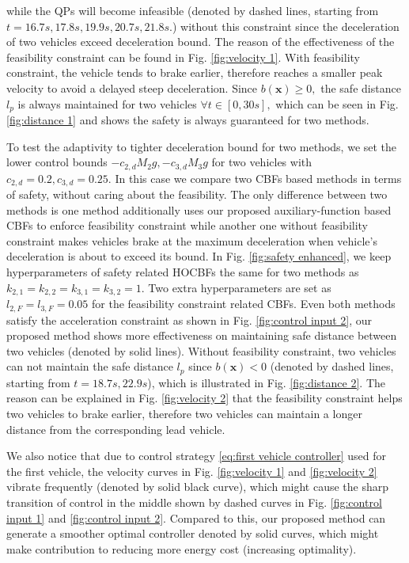 \documentclass[letterpaper, 10 pt, conference]{ieeeconf}
\theoremstyle{definition}
\begin{document}
while the QPs will become infeasible (denoted by dashed lines, starting from $t=16.7s, 17.8s, 19.9s, 20.7s, 21.8s.$) without this constraint since the deceleration of two vehicles exceed deceleration bound. The reason of the effectiveness of the feasibility constraint can be found in Fig. \ref{fig:velocity 1}. With feasibility constraint, the vehicle tends to brake earlier, therefore reaches a smaller peak velocity to avoid a delayed steep deceleration. Since $b(\boldsymbol{x})\ge 0,$ the safe distance $l_{p}$ is always maintained for two vehicles $\forall t \in [0, 30s],$ which can be seen in Fig. \ref{fig:distance 1} and shows the safety is always guaranteed for two methods. 

To test the adaptivity to tighter deceleration bound for two methods,  we set the lower
control bounds $-c_{2,d}M_{2}g, -c_{3,d}M_{3}g$ for two vehicles with $c_{2,d}=0.2,c_{3,d}=0.25.$ In this case we compare two CBFs based methods in terms of safety, without caring about the feasibility. The only difference between two methods is one method additionally uses our proposed auxiliary-function based CBFs to enforce feasibility constraint while another one without feasibility constraint makes vehicles brake at the maximum deceleration when vehicle's deceleration is about to exceed its bound. In Fig. \ref{fig:safety enhanced}, we keep hyperparameters of safety related HOCBFs the same for two methods as $k_{2,1}=k_{2,2}=k_{3,1}=k_{3,2}=1.$ Two extra hyperparameters are set as $l_{2,F}=l_{3,F}=0.05$ for the feasibility constraint related CBFs. Even both methods satisfy the acceleration constraint as shown in Fig. \ref{fig:control input 2}, our proposed method shows more effectiveness on maintaining safe distance between two vehicles (denoted by solid lines). Without feasibility constraint, two vehicles can not maintain the safe distance $l_{p}$ since $b(\boldsymbol{x}) <0$ (denoted by dashed lines, starting from $t=18.7s,22.9s$), which is illustrated in Fig. \ref{fig:distance 2}. The reason can be explained in Fig. \ref{fig:velocity 2} that the feasibility constraint helps two vehicles to brake earlier, therefore two vehicles can maintain a longer distance from the corresponding lead vehicle.

We also notice that due to control strategy \eqref{eq:first vehicle controller} used for the first vehicle, the velocity curves in Fig. \ref{fig:velocity 1} and \ref{fig:velocity 2} vibrate frequently (denoted by solid black curve), which might cause the sharp transition of control in the middle shown by dashed curves in Fig. \ref{fig:control input 1} and \ref{fig:control input 2}. Compared to this, our proposed method can generate a smoother optimal controller denoted by solid curves, which might make contribution to reducing more energy cost (increasing optimality).
\end{document}
